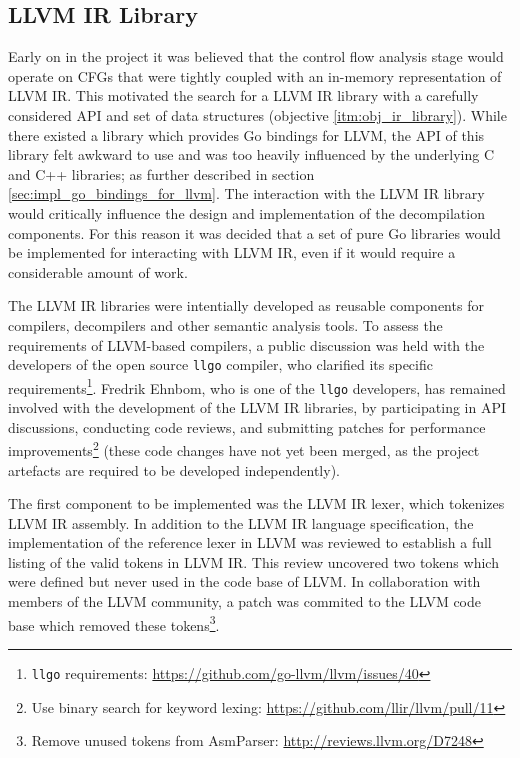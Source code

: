 
\subsection{LLVM IR Library}
\label{sec:impl_llvm_ir_library}

Early on in the project it was believed that the control flow analysis stage would operate on CFGs that were tightly coupled with an in-memory representation of LLVM IR. This motivated the search for a LLVM IR library with a carefully considered API and set of data structures (objective \ref{itm:obj_ir_library}). While there existed a library which provides Go bindings for LLVM, the API of this library felt awkward to use and was too heavily influenced by the underlying C and C++ libraries; as further described in section \ref{sec:impl_go_bindings_for_llvm}. The interaction with the LLVM IR library would critically influence the design and implementation of the decompilation components. For this reason it was decided that a set of pure Go libraries would be implemented for interacting with LLVM IR, even if it would require a considerable amount of work.


The LLVM IR libraries were intentially developed as reusable components for compilers, decompilers and other semantic analysis tools. To assess the requirements of LLVM-based compilers, a public discussion was held with the developers of the open source \texttt{llgo} compiler, who clarified its specific requirements\footnote{\texttt{llgo} requirements: \url{https://github.com/go-llvm/llvm/issues/40}}. Fredrik Ehnbom, who is one of the \texttt{llgo} developers, has remained involved with the development of the LLVM IR libraries, by participating in API discussions, conducting code reviews, and submitting patches for performance improvements\footnote{Use binary search for keyword lexing: \url{https://github.com/llir/llvm/pull/11}} (these code changes have not yet been merged, as the project artefacts are required to be developed independently).

The first component to be implemented was the LLVM IR lexer, which tokenizes LLVM IR assembly. In addition to the LLVM IR language specification, the implementation of the reference lexer in LLVM was reviewed to establish a full listing of the valid tokens in LLVM IR. This review uncovered two tokens which were defined but never used in the code base of LLVM. In collaboration with members of the LLVM community, a patch was commited to the LLVM code base which removed these tokens\footnote{Remove unused tokens from AsmParser: \url{http://reviews.llvm.org/D7248}}.

